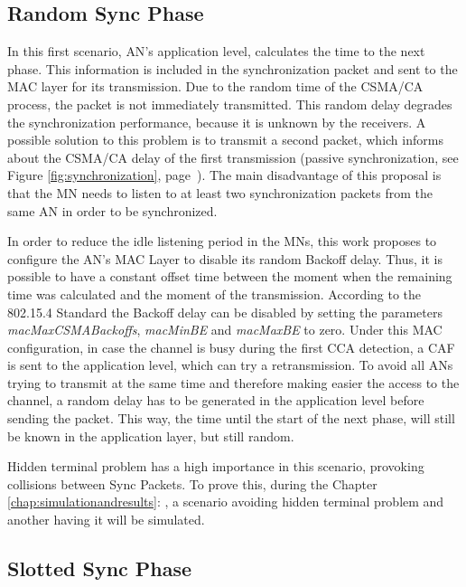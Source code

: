 \subsection{Random Sync Phase}

In this first scenario, \ac{AN}'s application level, calculates the time to the next phase. This information is included in the synchronization packet 
and sent to the \ac{MAC} layer for its transmission. Due to the random time of the \ac{CSMA/CA} process, the packet is not immediately transmitted. This 
random delay degrades the synchronization performance, because it is unknown by the receivers. A possible solution to this problem is to transmit a 
second packet, which informs about the \ac{CSMA/CA} delay of the first transmission (passive synchronization, see Figure \ref{fig:synchronization}, 
page~\pageref{fig:synchronization}). The main disadvantage of this proposal is that the \ac{MN} needs to listen to at least two synchronization packets 
from the same \ac{AN} in order to be synchronized.

In order to reduce the idle listening period in the \acp{MN}, this work proposes to configure the \ac{AN}'s \ac{MAC} Layer to disable its random 
Backoff delay. Thus, it is possible to have a constant offset time between the moment when the remaining time was calculated and the moment of the 
transmission. According to the 802.15.4 Standard the Backoff delay can be disabled by setting the parameters \textit{macMaxCSMABackoffs}, 
\textit{macMinBE} and \textit{macMaxBE} to zero. Under this \ac{MAC} configuration, in case the channel is busy during the first \ac{CCA} detection, a \ac{CAF} 
is sent to the application level, which can try a retransmission. To avoid all \acp{AN} trying to transmit at the same time and therefore making easier 
the access to the channel, a random delay has to be generated in the application level before sending the packet. This way, the time until the start of the
next phase, will still be known in the application layer, but still random.

Hidden terminal problem has a high importance in this scenario, provoking collisions between Sync Packets. To prove this, during the Chapter 
\ref{chap:simulationandresults}: , a scenario avoiding hidden terminal problem and another having it will be simulated.

\subsection{Slotted Sync Phase}
\label{subsec:slottedsyncphase}

